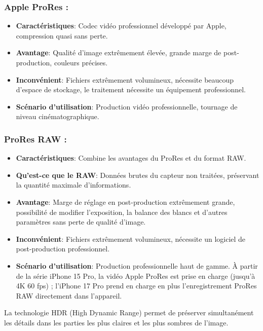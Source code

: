 \subsubsection*{Apple ProRes :}

\begin{itemize}
  \item \textbf{Caractéristiques}: Codec vidéo professionnel développé par Apple, compression quasi sans perte.
  \item \textbf{Avantage}: Qualité d'image extrêmement élevée, grande marge de post-production, couleurs précises.
  \item \textbf{Inconvénient}: Fichiers extrêmement volumineux, nécessite beaucoup d'espace de stockage, le traitement nécessite un équipement professionnel.
  \item \textbf{Scénario d'utilisation}: Production vidéo professionnelle, tournage de niveau cinématographique.
\end{itemize}

\subsubsection*{ProRes RAW :}

\begin{itemize}
  \item \textbf{Caractéristiques}: Combine les avantages du ProRes et du format RAW.
  \item \textbf{Qu'est-ce que le RAW}: Données brutes du capteur non traitées, préservant la quantité maximale d'informations.
  \item \textbf{Avantage}: Marge de réglage en post-production extrêmement grande, possibilité de modifier l'exposition, la balance des blancs et d'autres paramètres sans perte de qualité d'image.
  \item \textbf{Inconvénient}: Fichiers extrêmement volumineux, nécessite un logiciel de post-production professionnel.
  \item \textbf{Scénario d'utilisation}: Production professionnelle haut de gamme. À partir de la série iPhone 15 Pro, la vidéo Apple ProRes est prise en charge (jusqu'à 4K 60 fps) ; l'iPhone 17 Pro prend en charge en plus l'enregistrement ProRes RAW directement dans l'appareil.
\end{itemize}


La technologie HDR (High Dynamic Range) permet de préserver simultanément les détails dans les parties les plus claires et les plus sombres de l'image.

